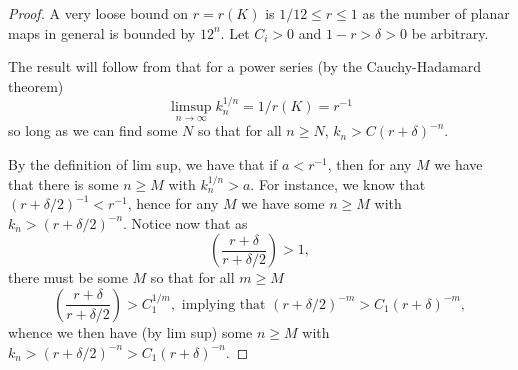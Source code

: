 \documentclass[amsmath,longbibliography,secnumarabic,floatfix,amssymb,nofootinbib,nobibnotes,letterpaper,11pt,notitlepage,preprint]{revtex4-1}
\begin{document}
\begin{proof} A very loose bound on $r = r(K)$ is $1/12 \le r \le 1$ as the number of planar maps in
  general is bounded by $12^n$. Let $C_i > 0$ and $1-r > \delta > 0$ be arbitrary.

  The result will follow from that for a power series (by the Cauchy-Hadamard theorem)
  \[ \limsup_{n\to\infty}{k_n^{1/n}} = 1/r(K) = r^{-1} \] so long as we can find some $N$ so that
  for all $n \ge N$, $k_n > C(r + \delta)^{-n}$.

  By the definition of lim sup, we have that if $a < r^{-1}$, then for any $M$ we have that there is
  some $n \ge M$ with $k_n^{1/n} > a$. For instance, we know that $(r + \delta/2)^{-1} < r^{-1}$,
  hence for any $M$ we have some $n \ge M$ with $k_n > (r+\delta/2)^{-n}$. Notice now that as
  \[ \left( \frac{r+\delta}{r + \delta/2} \right) > 1, \] there must be some $M$ so that for all $m
  \ge M$
  \[ \left( \frac{r+\delta}{r + \delta/2} \right) > C_1^{1/m}, \text{ implying that } (r +
  \delta/2)^{-m} > C_1(r + \delta)^{-m}, \] whence we then have (by lim sup) some $n \ge M$ with
  $k_n > (r+\delta/2)^{-n} > C_1(r+\delta)^{-n}$.


\end{proof}
\end{document}
